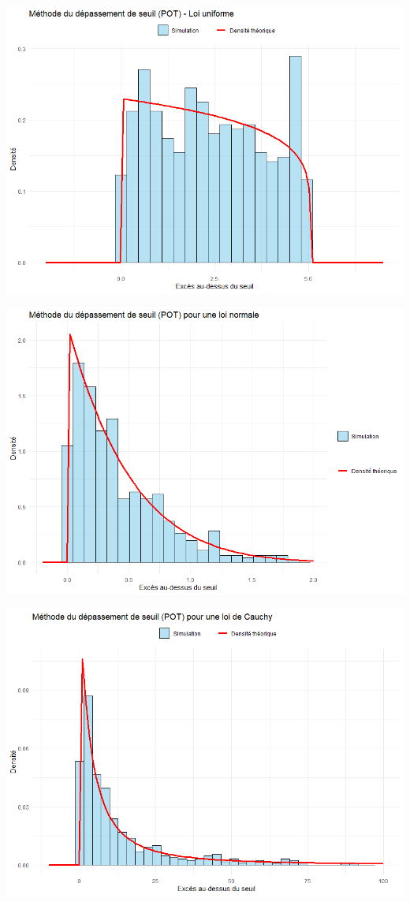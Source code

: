 \documentclass{article}
\theoremstyle{plain}
\theoremstyle{definition}
\theoremstyle{plain}
\begin{document}
\begin{center}
	\includegraphics[scale=0.60]{./images/DS_Uniforme} 
\end{center}

\begin{center}
	\includegraphics[scale=0.60]{./images/DS_Normale} 
\end{center}

\begin{center}
	\includegraphics[scale=0.60]{./images/DS_Cauchy} 
\end{center}
\end{document}
